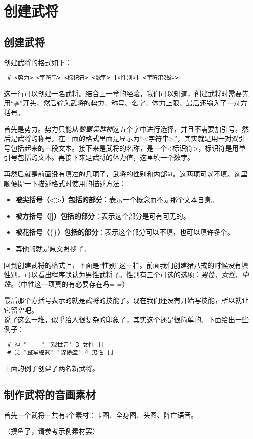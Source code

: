 \chapter{创建武将}

\section{创建武将}

创建武将的格式如下： \\

\begin{verbatim}
 # <势力> <字符串> <标识符> <数字> [<性别>] <字符串数组>
\end{verbatim}

这一行可以创建一名武将。结合上一章的经验，我们可以知道，创建武将时需要先用“\#”开头，然后输入武将的势力、称号、名字、体力上限，最后还输入了一对方括号。

首先是势力。势力只能从\emph{魏蜀吴群神}这五个字中进行选择，并且不需要加引号。然后是武将的称号，在上面的格式里面是显示为“<字符串>”，其实就是用一对双引号包括起来的一段文本。接下来是武将的名称，是一个<标识符>，标识符是用单引号包括的文本。再接下来是武将的体力值，这里填一个数字。

再然后就是前面没有填过的几项了，武将的性别和内部id。这两项可以不填。这里顺便提一下描述格式时使用的描述方法：

\begin{itemize}
 \item \textbf{被尖括号（<>）包括的部分}：表示一个概念而不是那个文本自身。
 \item \textbf{被方括号（[]）包括的部分}：表示这个部分是可有可无的。
 \item \textbf{被花括号（\{\}）包括的部分}：表示这个部分可以不填，也可以填许多个。
 \item 其他的就是原文照抄了。
\end{itemize}

回到创建武将的格式上，下面是“性别”这一栏。前面我们创建猪八戒的时候没有填性别，可以看出程序默认为男性武将了。性别有三个可选的选项：\emph{男性、女性、中性}。（中性这一项真的有必要存在吗= =）

最后那个方括号表示的就是武将的技能了。现在我们还没有开始写技能，所以就让它留空吧。\\

说了这么一堆，似乎给人很复杂的印象了，其实这个还是很简单的。下面给出一些例子：

\begin{verbatim}
 # 神 "----" '观世音' 3 女性 []
 # 吴 "整军经武" '谋徐盛' 4 男性 []
\end{verbatim}

上面的例子创建了两名新武将。\\


\section{制作武将的音画素材}

首先一个武将一共有4个素材：卡图、全身图、头图、阵亡语音。

（摸鱼了，请参考示例素材罢）
